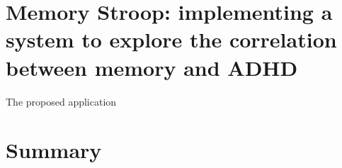 \section{Memory Stroop: implementing a system to explore the correlation between memory and ADHD}

The proposed application \citep{memory_adhd}

\section{Summary}
